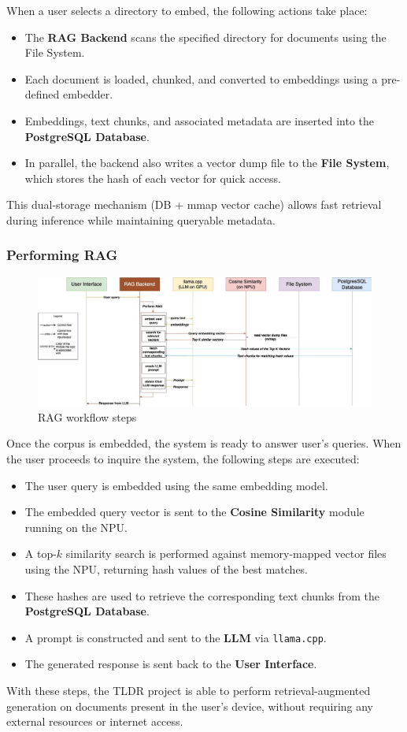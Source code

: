 When a user selects a directory to embed, the following actions take place:
\begin{itemize}
    \item The \textbf{RAG Backend} scans the specified directory for documents using the File System.
    \item Each document is loaded, chunked, and converted to embeddings using a pre-defined embedder.
    \item Embeddings, text chunks, and associated metadata are inserted into the \textbf{PostgreSQL Database}.
    \item In parallel, the backend also writes a vector dump file to the \textbf{File System}, which stores the hash of each vector for quick access.
\end{itemize}
This dual-storage mechanism (DB + mmap vector cache) allows fast retrieval during inference while maintaining queryable metadata.

\subsubsection{Performing RAG}
\label{subsec:AppDesignWorkflow-PerformingRAG}
\begin{figure}[H]
    \centering
    \includegraphics[width=1.0\linewidth]{images/tldr-app-worklfow-pt3.jpg}
    \caption{RAG workflow steps}
    \label{fig:ragworkflowsteps}
\end{figure}

Once the corpus is embedded, the system is ready to answer user's queries. When the user proceeds to inquire the system, the following steps are executed:

\begin{itemize}
    \item The user query is embedded using the same embedding model.
    \item The embedded query vector is sent to the \textbf{Cosine Similarity} module running on the NPU.
    \item A top-$k$ similarity search is performed against memory-mapped vector files using the NPU, returning hash values of the best matches.
    \item These hashes are used to retrieve the corresponding text chunks from the \textbf{PostgreSQL Database}.
    \item A prompt is constructed and sent to the \textbf{LLM} via \texttt{llama.cpp}.
    \item The generated response is sent back to the \textbf{User Interface}.
\end{itemize}


With these steps, the TLDR project is able to perform retrieval-augmented generation on documents present in the user's device, without requiring any external resources or internet access.
